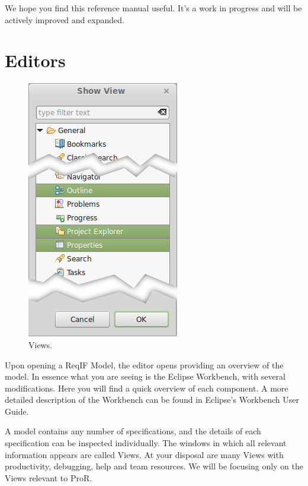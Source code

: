 % 

We hope you find this reference manual useful.  It's a work in progress and will be actively improved and expanded.

\section{Editors}

\begin{figure}
\centering
\includegraphics[width=.3\textwidth]{../rmf-images/views_highlighted.png}
\caption{Views.}
\label{fig:Views}
\end{figure}

Upon opening a ReqIF Model, the editor opens providing an overview of the model.  In essence what you are seeing is the Eclipse Workbench, with several modifications.  Here you will find a quick overview of each component.  A more detailed description of the Workbench can be found in Eclipse's Workbench User Guide.

A model contains any number of specifications, and the details of each specification can be inspected individually.  The windows in which all relevant information appears are called Views.  At your disposal are many Views with productivity, debugging, help and team resources.  We will be focusing only on the Views relevant to ProR.


